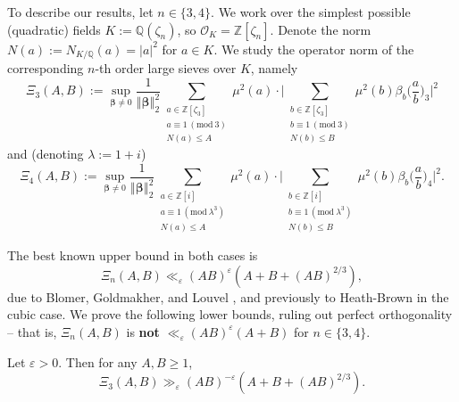 \documentclass[12pt,reqno]{amsart}
\numberwithin{equation}{section}
\renewcommand{\pmod}[1]{\, (\mathrm{mod}\ #1)}
\newcommand\norm[1]{\left\Vert {#1} \right\Vert}
\newcommand{\Q}{\mathbb{Q}}
\begin{document}
To describe our results, let $n \in \{3, 4\}$. We work over the simplest possible (quadratic) fields $K := \Q(\zeta_n)$, so $\mathcal{O}_{K}=\mathbb{Z}[\zeta_n]$. Denote the norm $N(a):=N_{K/\mathbb{Q}}(a)= |a|^2$ for $a \in K$. We study the operator norm of the corresponding $n$-th order large sieves over $K$, namely
\begin{equation}\label{eq:Xi_3_def}
    \Xi_3(A,B):= \sup_{\boldsymbol{\beta} \neq 0} \frac{1}{\norm{\boldsymbol{\beta}}^2_2} \sum_{\substack{ a \in \mathbb{Z}[\zeta_3] \\ a \equiv 1 \pmod{3} \\ N(a) \leq A}} \mu^2(a) \cdot \Bigg | \sum_{\substack{ b \in \mathbb{Z}[\zeta_3] \\ b \equiv 1 \pmod{3} \\ N(b) \leq B }} \mu^2(b) \beta_b \Big(\frac{a}{b}\Big)_3  \Bigg |^2
\end{equation}
and (denoting $\lambda := 1 + i$)
\begin{equation}\label{eq:Xi_def}
    \Xi_4(A,B):= \sup_{\boldsymbol{\beta} \neq 0} \frac{1}{\norm{\boldsymbol{\beta}}^2_2} \sum_{\substack{ a \in \mathbb{Z}[i] \\ a \equiv 1 \pmod{\lambda^3} \\ N(a) \leq A}} \mu^2(a) \cdot \Bigg | \sum_{\substack{ b \in \mathbb{Z}[i] \\ b \equiv 1 \pmod{\lambda^3} \\ N(b) \leq B }} \mu^2(b) \beta_b \Big(\frac{a}{b}\Big)_4  \Bigg |^2.
\end{equation}

The best known upper bound in both cases is
\begin{equation} \label{eq:BGL_upper_bound}
    \Xi_n(A,B) \ll_{\varepsilon} (AB)^{\varepsilon}(A+B+(AB)^{2/3}),
\end{equation}
due to Blomer, Goldmakher, and Louvel \cite[Theorem~1.3]{BGL}, 
and previously to Heath-Brown \cite[Theorem~2]{HB} in the cubic case.
We prove the following lower bounds, ruling out perfect orthogonality -- that is, $\Xi_n(A,B)$ is \textbf{not} $ \ll_\varepsilon (AB)^{\varepsilon} (A + B)$
for $n \in \{3,4\}$.

\begin{theorem} \label{thm:cubic_main}
    Let $\varepsilon > 0$. Then for any $A, B \geq 1$,
    \begin{equation} \label{eq:cubic_lower_bound}
        \Xi_3(A,B)  \gg_\varepsilon (AB)^{-\varepsilon} (A + B + (AB)^{2/3}).
    \end{equation}
\end{theorem}
\end{document}
